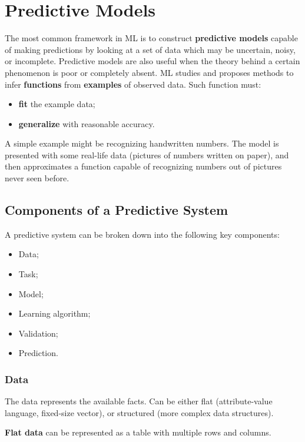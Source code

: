 \chapter{Predictive Models}

The most common framework in ML is to construct \textbf{predictive models} capable of making predictions by looking at a set of data which may be uncertain, noisy, or incomplete. Predictive models are also useful when the theory behind a certain phenomenon is poor or completely absent. ML studies and proposes methods to infer \textbf{functions} from \textbf{examples} of observed data. Such function must:
    \begin{itemize}
        \item \textbf{fit} the example data;
        \item \textbf{generalize} with reasonable accuracy.
    \end{itemize}

A simple example might be recognizing handwritten numbers. The model is presented with some real-life data (pictures of numbers written on paper), and then approximates a function capable of recognizing numbers out of pictures never seen before. 

\section{Components of a Predictive System}

A predictive system can be broken down into the following key components:

\begin{itemize}
    \item Data;
    \item Task;
    \item Model;
    \item Learning algorithm;
    \item Validation;
    \item Prediction.
\end{itemize}

\subsection{Data}

The data represents the available facts. Can be either flat (attribute-value language, fixed-size vector), or structured (more complex data structures).

\textbf{Flat data} can be represented as a table with multiple rows and columns.

